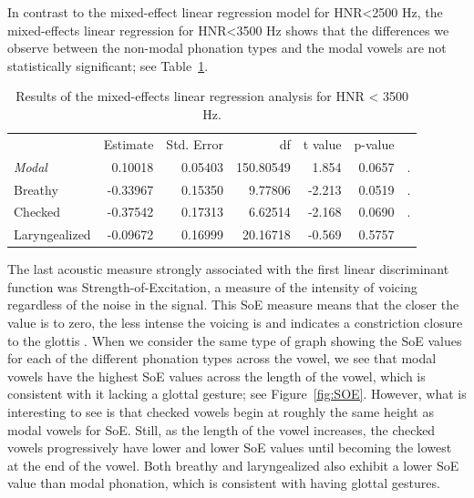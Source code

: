 \documentclass[12pt, letterpaper]{article}
\providecommand{\lsptoprule}{\midrule\toprule}
\providecommand{\lspbottomrule}{\bottomrule\midrule}
\begin{document}
In contrast to the mixed-effect linear regression model for HNR<2500 Hz, the mixed-effects linear regression for HNR\textless 3500 Hz shows that the differences we observe between the non-modal phonation types and the modal vowels are not statistically significant; see Table~\ref*{tab:HNR35}. 
\begin{table}[!h]
    \centering
    \caption{Results of the mixed-effects linear regression analysis for HNR < 3500 Hz.}
    \label{tab:HNR35}
    \begin{tabular}{lrrrrrl}
	\lsptoprule
					&  Estimate  & Std. Error & df & t value & p-value & \\
        \textit{Modal}  &   0.10018  &  0.05403 & 150.80549 &  1.854 &  0.0657 & . \\  
  	Breathy   		&  -0.33967  &  0.15350 &  9.77806  &-2.213 &  0.0519 & . \\
	Checked    		&  -0.37542  &  0.17313 &  6.62514  &-2.168 &  0.0690 & . \\
	Laryngealized	&  -0.09672  &  0.16999 & 20.16718  &-0.569 &  0.5757 & \\
    \lspbottomrule
    \end{tabular}
\end{table}

The last acoustic measure strongly associated with the first linear discriminant function was Strength-of-Excitation, a measure of the intensity of voicing regardless of the noise in the signal. This SoE measure means that the closer the value is to zero, the less intense the voicing is and indicates a constriction closure to the glottis \citep{mittalStudyEffectsVocal2014,garellekVoicingGlottalConsonants2021}. When we consider the same type of graph showing the SoE values for each of the different phonation types across the vowel, we see that modal vowels have the highest SoE values across the length of the vowel, which is consistent with it lacking a glottal gesture; see Figure~\ref{fig:SOE}. However, what is interesting to see is that checked vowels begin at roughly the same height as modal vowels for SoE. Still, as the length of the vowel increases, the checked vowels progressively have lower and lower SoE values until becoming the lowest at the end of the vowel. Both breathy and laryngealized also exhibit a lower SoE value than modal phonation, which is consistent with having glottal gestures.
\end{document}
